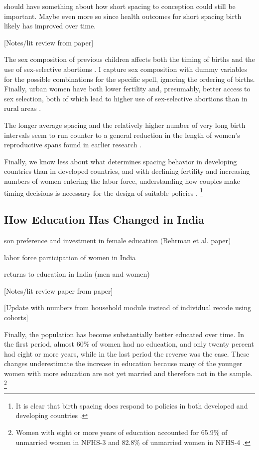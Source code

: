 should have something about how short spacing to conception could still be important.
Maybe even more so since health outcomes for short spacing birth likely has improved
over time.


[Notes/lit review from paper]


The sex composition of previous children affects both the timing of births and the use of 
sex-selective abortions 
\citep{retherford03b,jha06,Bhalotra2008,abrevaya09,Portner2015b,Kumar2016,Soest2018}.
I capture sex composition with dummy variables for the
possible combinations for the specific spell, ignoring the ordering of births.
Finally, urban women have both lower fertility and, presumably, better access to
sex selection, both of which lead to higher use of sex-selective abortions than in 
rural areas \citep{retherford03b,jha06,Portner2015b}.


The longer average spacing and the relatively higher number of very long birth intervals 
seem to run counter to a general reduction in the length of women's reproductive spans 
found in earlier research \citep{Padmadas2004}.



Finally, we know less about what determines spacing behavior in developing countries than 
in developed countries, and with declining fertility and increasing numbers of women 
entering the labor force, understanding how couples make timing decisions is necessary 
for the design of suitable policies \citep{Portner2018}.%
\footnote{
It is clear that birth spacing does respond to policies in both developed and 
developing countries \citep{Pettersson-Lidbom2009,Todd2012,Meckel2015,Ghosh2018}.
}



\subsection{How Education Has Changed in India}

son preference and investment in female education (Behrman et al. paper)

labor force participation of women in India

returns to education in India (men and women)

[Notes/lit review paper from paper]

[Update with numbers from household module instead of individual recode using cohorts]

Finally, the population has become substantially better educated over time.
In the first period, almost 60\% of women had no education, and only twenty percent had
eight or more years, while in the last period the reverse was the case.
These changes underestimate the increase in education because many of the younger women 
with more education are not yet married and therefore not in the sample.%
\footnote{
Women with eight or more years of education accounted for 65.9\% of
unmarried women in NFHS-3 and 82.8\% of unmarried women in NFHS-4
\citep{International-Institute-for-Population-Sciences-IIPS2007,International-Institute-for-Population-Sciences-IIPS2017}.
}

